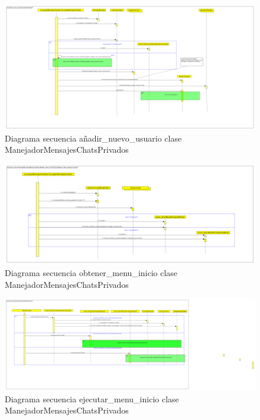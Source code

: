 \begin{figure}[H] %
\centering
\includegraphics[scale=0.14]{imagenes/diagramas/secuencia/grandes/anadir_nuevo_usuario.png}  %

\caption{Diagrama secuencia añadir\_nuevo\_usuario clase  ManejadorMensajesChatsPrivados}\label{figura222}
\end{figure}


\begin{figure}[H] %
\centering
\includegraphics[scale=0.16]{imagenes/diagramas/secuencia/grandes/obtener_menu_inicio.png}  %

\caption{Diagrama secuencia obtener\_menu\_inicio clase  ManejadorMensajesChatsPrivados}\label{figura223}
\end{figure}

\begin{figure}[H] %
\centering
\includegraphics[scale=0.16]{imagenes/diagramas/secuencia/grandes/menu_inicio_ejecutar.png}  %

\caption{Diagrama secuencia ejecutar\_menu\_inicio clase  ManejadorMensajesChatsPrivados}\label{figura227}
\end{figure}

